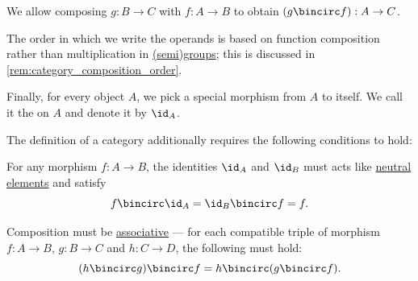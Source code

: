 \begin{definition}
\begin{thmenum}[series=def:category]
    We allow composing \( g: B \to C \) with \( f: A \to B \) to obtain \( (g \bincirc f): A \to C \).

    The order in which we write the operands is based on function composition rather than multiplication in \hyperref[def:group]{(semi)groups}; this is discussed in \cref{rem:category_composition_order}.

     Finally, for every object \( A \), we pick a special morphism from \( A \) to itself. We call it the  on \( A \) and denote it by \( \id_A \).
  \end{thmenum}

  The definition of a category additionally requires the following conditions to hold:
  \begin{thmenum}[resume=def:category]
     For any morphism \( f: A \to B \), the identities \( \id_A \) and \( \id_B \) must acts like \hyperref[def:semigroup_neutral_element]{neutral elements} and satisfy
    \begin{equation*}
      f \bincirc \id_A = \id_B \bincirc f = f.
    \end{equation*}

     Composition must be \hyperref[def:binary_operation/associative]{associative} --- for each compatible triple of morphism \( f: A \to B \), \( g: B \to C \) and \( h: C \to D \), the following must hold:
    \begin{equation*}
      (h \bincirc g) \bincirc f = h \bincirc (g \bincirc f).
    \end{equation*}
  \end{thmenum}
\end{definition}
